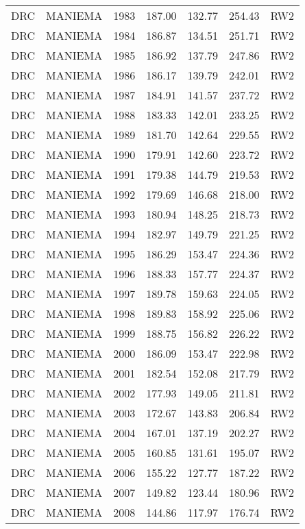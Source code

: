 \begin{longtable}{lllrrrl}
  DRC & MANIEMA & 1983 & 187.00 & 132.77 & 254.43 & RW2 \\ 
  DRC & MANIEMA & 1984 & 186.87 & 134.51 & 251.71 & RW2 \\ 
  DRC & MANIEMA & 1985 & 186.92 & 137.79 & 247.86 & RW2 \\ 
  DRC & MANIEMA & 1986 & 186.17 & 139.79 & 242.01 & RW2 \\ 
  DRC & MANIEMA & 1987 & 184.91 & 141.57 & 237.72 & RW2 \\ 
  DRC & MANIEMA & 1988 & 183.33 & 142.01 & 233.25 & RW2 \\ 
  DRC & MANIEMA & 1989 & 181.70 & 142.64 & 229.55 & RW2 \\ 
  DRC & MANIEMA & 1990 & 179.91 & 142.60 & 223.72 & RW2 \\ 
  DRC & MANIEMA & 1991 & 179.38 & 144.79 & 219.53 & RW2 \\ 
  DRC & MANIEMA & 1992 & 179.69 & 146.68 & 218.00 & RW2 \\ 
  DRC & MANIEMA & 1993 & 180.94 & 148.25 & 218.73 & RW2 \\ 
  DRC & MANIEMA & 1994 & 182.97 & 149.79 & 221.25 & RW2 \\ 
  DRC & MANIEMA & 1995 & 186.29 & 153.47 & 224.36 & RW2 \\ 
  DRC & MANIEMA & 1996 & 188.33 & 157.77 & 224.37 & RW2 \\ 
  DRC & MANIEMA & 1997 & 189.78 & 159.63 & 224.05 & RW2 \\ 
  DRC & MANIEMA & 1998 & 189.83 & 158.92 & 225.06 & RW2 \\ 
  DRC & MANIEMA & 1999 & 188.75 & 156.82 & 226.22 & RW2 \\ 
  DRC & MANIEMA & 2000 & 186.09 & 153.47 & 222.98 & RW2 \\ 
  DRC & MANIEMA & 2001 & 182.54 & 152.08 & 217.79 & RW2 \\ 
  DRC & MANIEMA & 2002 & 177.93 & 149.05 & 211.81 & RW2 \\ 
  DRC & MANIEMA & 2003 & 172.67 & 143.83 & 206.84 & RW2 \\ 
  DRC & MANIEMA & 2004 & 167.01 & 137.19 & 202.27 & RW2 \\ 
  DRC & MANIEMA & 2005 & 160.85 & 131.61 & 195.07 & RW2 \\ 
  DRC & MANIEMA & 2006 & 155.22 & 127.77 & 187.22 & RW2 \\ 
  DRC & MANIEMA & 2007 & 149.82 & 123.44 & 180.96 & RW2 \\ 
  DRC & MANIEMA & 2008 & 144.86 & 117.97 & 176.74 & RW2 \\ 

\end{longtable}
